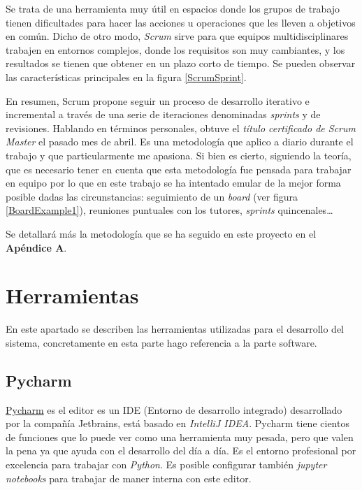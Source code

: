 Se trata de una herramienta muy útil en espacios donde los grupos de trabajo tienen dificultades para hacer las acciones u operaciones que les lleven a objetivos en común. Dicho de otro modo, \textit{Scrum} sirve para que equipos multidisciplinares trabajen en entornos complejos, donde los requisitos son muy cambiantes, y los resultados se tienen que obtener en un plazo corto de tiempo.  Se pueden observar las características principales en la figura \ref{ScrumSprint}.



En resumen, Scrum propone seguir un proceso de desarrollo iterativo e incremental a través de una serie de iteraciones denominadas \textit{sprints} y de revisiones. 
Hablando en términos personales, obtuve el \textit{título certificado de Scrum Master} el pasado mes de abril. Es una metodología que aplico a diario durante el trabajo y que particularmente me apasiona. Si bien es cierto, siguiendo la teoría, que es necesario tener en cuenta que esta metodología fue pensada para trabajar en equipo por lo que en este trabajo se ha intentado emular de la mejor forma posible dadas las circunstancias: seguimiento de un \emph{board} (ver figura \ref{BoardExample1}), reuniones puntuales con los tutores, \emph{sprints} quincenales\ldots


Se detallará más la metodología que se ha seguido en este proyecto en el \textbf{Apéndice A}.
\section{Herramientas}\label{herramientas}
En este apartado se describen las herramientas utilizadas para el desarrollo del sistema, concretamente en esta parte hago referencia a la parte software.

\subsection{Pycharm}\label{herramientas_pycharm}
\href{https://www.jetbrains.com/pycharm/}{Pycharm} es el editor es un IDE (Entorno de desarrollo integrado) desarrollado por la compañía Jetbrains, está basado en\textit{ IntelliJ IDEA}. Pycharm tiene cientos de funciones que lo puede ver como una herramienta muy pesada, pero que valen la pena ya que ayuda con el desarrollo del día a día. Es el entorno profesional por excelencia para trabajar con \textit{Python}. Es posible configurar también\textit{ jupyter notebooks} para trabajar de maner interna con este editor.

